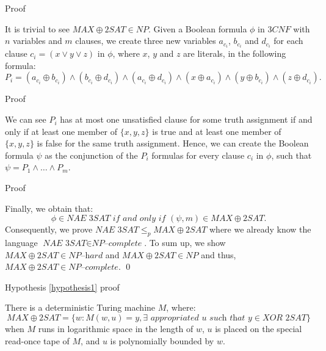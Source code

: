 \documentclass[11pt]{beamer}
\begin{document}
\begin{frame}{Proof}

It is trivial to see $MAX\oplus2SAT \in NP$. Given a Boolean formula $\phi$ in $3CNF$ with $n$ variables and $m$ clauses, we create three new variables $a_{c_{i}}$, $b_{c_{i}}$ and $d_{c_{i}}$ for each clause $c_{i} = (x \vee y \vee z)$ in $\phi$, where $x$, $y$ and $z$ are literals, in the following formula:
\[P_{i} = (a_{c_{i}} \oplus b_{c_{i}}) \wedge (b_{c_{i}} \oplus d_{c_{i}}) \wedge (a_{c_{i}} \oplus d_{c_{i}}) \wedge (x \oplus a_{c_{i}}) \wedge (y \oplus b_{c_{i}}) \wedge (z \oplus d_{c_{i}}).\]

\end{frame}

\begin{frame}{Proof}

We can see $P_{i}$ has at most one unsatisfied clause for some truth assignment if and only if at least one member of $\{x,y,z\}$ is true and at least one member of $\{x,y,z\}$ is false for the same truth assignment. Hence, we can create the Boolean formula $\psi$ as the conjunction of the $P_{i}$ formulas for every clause $c_{i}$ in $\phi$, such that $\psi = P_{1} \wedge \ldots \wedge P_{m}$.

\end{frame}

\begin{frame}{Proof}

Finally, we obtain that:
\[\phi \in \textit{NAE 3SAT} \textit{ if and only if } (\psi, m) \in MAX\oplus2SAT.\]
Consequently, we prove $\textit{NAE 3SAT} \leq_{p} MAX\oplus2SAT$ where we already know the language $\textit{NAE 3SAT} \in \textit{NP--complete}$. To sum up, we show $MAX\oplus2SAT \in \textit{NP--hard}$ and $MAX\oplus2SAT \in NP$ and thus, $MAX\oplus2SAT \in \textit{NP--complete}$. \qed

\end{frame}

\begin{frame}{Hypothesis \ref{hypothesis1} proof}

\begin{theorem}
\label{proof}
There is a deterministic Turing machine $M$, where:
\[MAX\oplus2SAT = \{w: M(w, u) = y, \exists \textit{ appropriated } u \textit{ such that } y \in \textit{XOR 2SAT}\}\]
when $M$ runs in logarithmic space in the length of $w$, $u$ is placed on the special read-once tape of $M$, and $u$ is polynomially bounded by $w$.
\end{theorem}

\end{frame}
\end{document}
